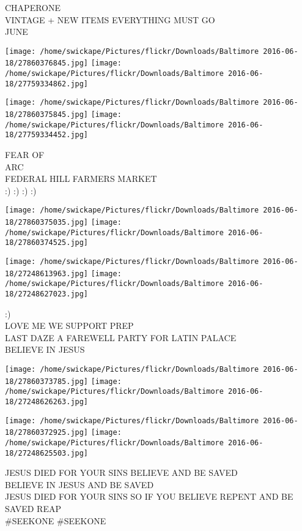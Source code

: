 \documentclass[10pt,letterpaper]{article}
\begin{document}
CHAPERONE\\
VINTAGE + NEW ITEMS EVERYTHING MUST GO\\
JUNE\\
\pagebreak

\texttt{[image: /home/swickape/Pictures/flickr/Downloads/Baltimore 2016-06-18/27860376845.jpg]}
\texttt{[image: /home/swickape/Pictures/flickr/Downloads/Baltimore 2016-06-18/27759334862.jpg]}

\texttt{[image: /home/swickape/Pictures/flickr/Downloads/Baltimore 2016-06-18/27860375845.jpg]}
\texttt{[image: /home/swickape/Pictures/flickr/Downloads/Baltimore 2016-06-18/27759334452.jpg]}

FEAR OF\\
ARC\\
FEDERAL HILL FARMERS MARKET\\
:) :) :) :)\\
\pagebreak

\texttt{[image: /home/swickape/Pictures/flickr/Downloads/Baltimore 2016-06-18/27860375035.jpg]}
\texttt{[image: /home/swickape/Pictures/flickr/Downloads/Baltimore 2016-06-18/27860374525.jpg]}

\texttt{[image: /home/swickape/Pictures/flickr/Downloads/Baltimore 2016-06-18/27248613963.jpg]}
\texttt{[image: /home/swickape/Pictures/flickr/Downloads/Baltimore 2016-06-18/27248627023.jpg]}

:)\\
LOVE ME WE SUPPORT PREP\\
LAST DAZE A FAREWELL PARTY FOR LATIN PALACE\\
BELIEVE IN JESUS\\
\pagebreak

\texttt{[image: /home/swickape/Pictures/flickr/Downloads/Baltimore 2016-06-18/27860373785.jpg]}
\texttt{[image: /home/swickape/Pictures/flickr/Downloads/Baltimore 2016-06-18/27248626263.jpg]}

\texttt{[image: /home/swickape/Pictures/flickr/Downloads/Baltimore 2016-06-18/27860372925.jpg]}
\texttt{[image: /home/swickape/Pictures/flickr/Downloads/Baltimore 2016-06-18/27248625503.jpg]}

JESUS DIED FOR YOUR SINS BELIEVE AND BE SAVED\\
BELIEVE IN JESUS AND BE SAVED\\
JESUS DIED FOR YOUR SINS SO IF YOU BELIEVE REPENT AND BE SAVED REAP\\
\#SEEKONE \#SEEKONE\\
\pagebreak
\end{document}
